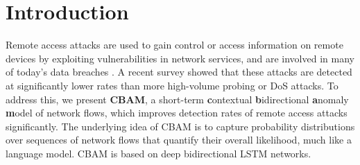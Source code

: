 %
%


\section{Introduction}





Remote access attacks are used to gain control or access information on remote devices by exploiting vulnerabilities in network services, and are involved in many of today's data breaches \cite{mandiant2015trends}.
A recent survey \cite{nisioti2018intrusion} showed that these attacks are detected at significantly lower rates than more high-volume probing or DoS attacks. 
To address this, we present \textbf{CBAM}, a short-term \textbf{c}ontextual \textbf{b}idirectional \textbf{a}nomaly \textbf{m}odel of network flows, which improves detection rates of remote access attacks significantly. The underlying idea of CBAM is to capture probability distributions over sequences of network flows that quantify their overall likelihood, much like a language model. 
CBAM is based on deep bidirectional LSTM networks. 	

